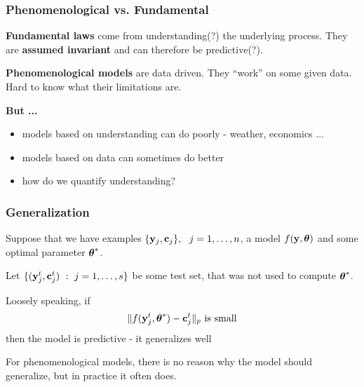\documentclass[12pt,fleqn]{beamer}
\begin{document}
\begin{frame}\frametitle{Phenomenological vs. Fundamental}

\textbf{Fundamental laws} come from understanding(?) the underlying process.
They are {\bf assumed invariant} and can therefore be predictive(?).

\bigskip

\textbf{Phenomenological models} are data driven. They ``work'' on some given data.
Hard to know what their limitations are.

\bigskip

{\bf But ...}
\begin{itemize}
\item models based on understanding can do poorly - weather, economics ...
\item models based on data can sometimes do better
\item how do we quantify understanding?
\end{itemize}

\end{frame}


\begin{frame}\frametitle{Generalization}

Suppose that we have examples $\{{\bf y}_j,{\bf c}_j\},\ \ j=1,\ldots,n$,
a model $f({\bf y},{\boldsymbol \theta})$ and some optimal parameter ${\boldsymbol \theta}^*$.

Let $\{({\bf y}^t_j,{\bf c}^t_j) \ : \  j=1,\ldots,s\}$ be some test set, that was not used
to compute ${\boldsymbol \theta}^*$.

\pause

Loosely speaking, if
$$ \|f({\bf y}^t_j,{\boldsymbol \theta}^*) - {\bf c}_j^t\|_p \text{ is small}$$
then the model is predictive - it generalizes well



\pause
\bigskip


For phenomenological models, there is no reason why the model
should generalize, but in practice it often does.


\end{frame}
\end{document}
